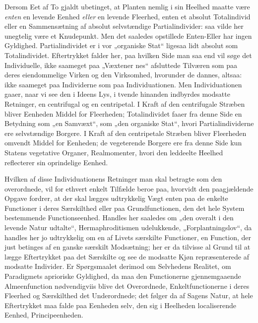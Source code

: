 \documentclass[11pt]{book}
\newcommand{\opage}[1]{\marginnote{\footnotesize\textit{[#1]}}}
\begin{document}
Dersom Eet af To gjaldt ubetinget, at Planten nemlig i sin Heelhed
maatte være \emph{enten} en levende Eenhed \emph{eller} en levende
Fleerhed, enten et absolut Totalindivid eller en Sammensætning af
absolut selvstændige Partialindivider: saa vilde her unegtelig være et
Knudepunkt. Men det saaledes opstillede Enten-Eller har ingen
Gyldighed. Partialindividet er i vor „organiske Stat“ ligesaa lidt
absolut som Totalindividet. Eftertrykket falder her, paa hvilken Side
man saa
\opage{316} \setcounter{footnote}{0}%
end vil søge det Individuelle, ikke saameget paa „Væxtener\-%
nes“ afsluttede Tilværen som paa deres eiendommelige Virken og den
Virksomhed, hvorunder de dannes, altsaa: ikke saameget paa
Individerne som paa Individuationen. Men Individuationen gaaer,
naar vi see den i Ideens Lys, i tvende hinanden indbyrdes modsatte
Retninger, en centrifugal og en centripetal. I Kraft af den
centrifugale Stræben bliver Eenheden Middel for Fleerheden;
Totalindividet faaer fra denne Side en Betydning som „en Samvæxt“,
som „den organiske Stat“, hvori Partialindividerne ere selvstændige
Borgere. I Kraft af den centripetale Stræben bliver Fleerheden
omvendt Middel for Eenheden; de vegeterende Borgere ere fra denne
Side kun Statens vegetative Organer, Realmomenter, hvori den
leddeelte Heelhed reflecterer sin oprindelige Eenhed.

Hvilken af disse Individuationens Retninger man skal betragte som
den overordnede, vil for ethvert enkelt Tilfælde beroe paa, hvorvidt
den paagjældende Opgave fordrer, at der skal lægges udtrykkelig Vægt
enten paa de enkelte Functioner i deres Særskilthed eller paa
Grundfunctionen, den det hele System bestemmende Functionseenhed.
Handles her saaledes om „den overalt i den levende Natur udtalte“,
Hermaphroditismen udelukkende, „Forplantningslov“, da handles her
jo udtrykkelig om en af Livets særskilte Functioner, en Function, der
just betinges af en ganske særskilt Modsætning; her er da tilvisse al
Grund til at lægge Eftertrykket paa det Særskilte og see de modsatte
Kjøn repræsenterede af modsatte Individer. Er Spørgsmaalet derimod
om Selvhedens Realitet, om Paradigmets aprioriske Gyldighed, da maa
den Functionerne gjennemgaaende Almeenfunction nødvendigviis blive
det Overordnede, Enkeltfunctionerne i deres Fleerhed og Særskilthed
det Underordnede; det følger da af Sagens Natur, at hele
Eftertrykket maa falde paa Eenheden selv, den sig i Heelheden
localiserende Eenhed, Principeenheden.
\end{document}

